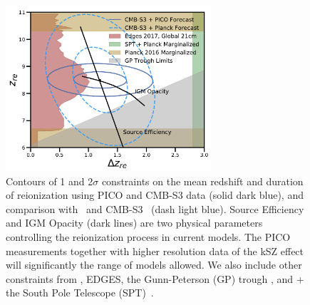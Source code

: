 \documentclass[PICOReport.tex]{subfiles}
\begin{document}
\begin{figure}
\hspace{-0.2in}
\parbox{3.1in}{\centerline {
\includegraphics[width=3.0in]{images/Reionization_Contours_zbar_delz_PICO_NEW.pdf} } }
\hspace{0.in}
\parbox{3.5in}{
\caption{\label{fig:ReionizationPICO} Contours of 1 and 2$\sigma$ constraints on the mean redshift and duration of reionization using PICO and CMB-S3 data (solid dark blue), and comparison with \planck\ and CMB-S3~ (dash light blue). Source Efficiency and IGM Opacity (dark lines) are two physical parameters controlling the reionization process in current models. The PICO measurements together with higher resolution data of the kSZ effect will significantly the range of models allowed. We also include other constraints from \planck , EDGES, the Gunn-Peterson (GP) trough , and \planck + the South Pole Telescope (SPT)~\citep{Planck2018_VI,EDGES2017,Fan2006,Planck2016_reion}.  
} }
\vspace{-0.1in}
\end{figure}
\end{document}
